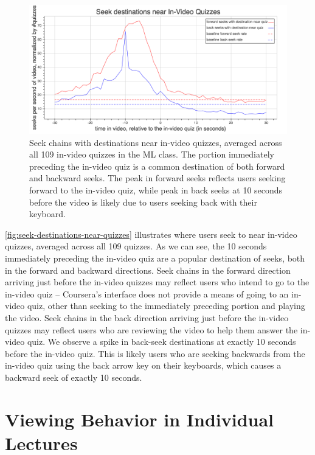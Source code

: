 \documentclass{sigchi}
\begin{document}
\begin{figure}
\includegraphics[width=1.0\columnwidth]{seek-destinations-near-quizzes}
\caption{Seek chains with destinations near in-video quizzes, averaged across all 109 in-video quizzes in the ML class. The portion immediately preceding the in-video quiz is a common destination of both forward and backward seeks. The peak in forward seeks reflects users seeking forward to the in-video quiz, while peak in back seeks at 10 seconds before the video is likely due to users seeking back with their keyboard.}
\label{fig:seek-destinations-near-quizzes}
\end{figure}

\autoref{fig:seek-destinations-near-quizzes} illustrates where users seek to near in-video quizzes, averaged across all 109 quizzes. As we can see, the 10 seconds immediately preceding the in-video quiz are a popular destination of seeks, both in the forward and backward directions. Seek chains in the forward direction arriving just before the in-video quizzes may reflect users who intend to go to the in-video quiz -- Coursera's interface does not provide a means of going to an in-video quiz, other than seeking to the immediately preceding portion and playing the video. Seek chains in the back direction arriving just before the in-video quizzes may reflect users who are reviewing the video to help them answer the in-video quiz. We observe a spike in back-seek destinations at exactly 10 seconds before the in-video quiz. This is likely users who are seeking backwards from the in-video quiz using the back arrow key on their keyboards, which causes a backward seek of exactly 10 seconds.

\section{Viewing Behavior in Individual Lectures}
\end{document}
